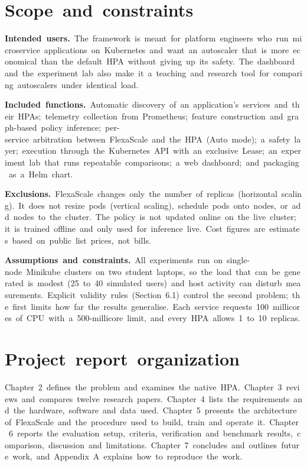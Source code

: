 \documentclass[12pt,a4paper,oneside]{report}
\begin{document}
\section{Scope~and~constraints}

\textbf{Intended~users.}~The~framework~is~meant~for~platform~engineers~who~run~microservice~applications~on~Kubernetes~and~want~an~autoscaler~that~is~more~economical~than~the~default~HPA~without~giving~up~its~safety.~The~dashboard~and~the~experiment~lab~also~make~it~a~teaching~and~research~tool~for~comparing~autoscalers~under~identical~load.


\textbf{Included~functions.}~Automatic~discovery~of~an~application's~services~and~their~HPAs;~telemetry~collection~from~Prometheus;~feature~construction~and~graph-based~policy~inference;~per-service~arbitration~between~FlexaScale~and~the~HPA~(Auto~mode);~a~safety~layer;~execution~through~the~Kubernetes~API~with~an~exclusive~Lease;~an~experiment~lab~that~runs~repeatable~comparisons;~a~web~dashboard;~and~packaging~as~a~Helm~chart.


\textbf{Exclusions.}~FlexaScale~changes~only~the~number~of~replicas~(horizontal~scaling).~It~does~not~resize~pods~(vertical~scaling),~schedule~pods~onto~nodes,~or~add~nodes~to~the~cluster.~The~policy~is~not~updated~online~on~the~live~cluster;~it~is~trained~offline~and~only~used~for~inference~live.~Cost~figures~are~estimates~based~on~public~list~prices,~not~bills.


\textbf{Assumptions~and~constraints.}~All~experiments~run~on~single-node~Minikube~clusters~on~two~student~laptops,~so~the~load~that~can~be~generated~is~modest~(25~to~40~simulated~users)~and~host~activity~can~disturb~measurements.~Explicit~validity~rules~(Section~6.1)~control~the~second~problem;~the~first~limits~how~far~the~results~generalise.~Each~service~requests~100~millicores~of~CPU~with~a~500-millicore~limit,~and~every~HPA~allows~1~to~10~replicas.


\section{Project~report~organization}

Chapter~2~defines~the~problem~and~examines~the~native~HPA.~Chapter~3~reviews~and~compares~twelve~research~papers.~Chapter~4~lists~the~requirements~and~the~hardware,~software~and~data~used.~Chapter~5~presents~the~architecture~of~FlexaScale~and~the~procedure~used~to~build,~train~and~operate~it.~Chapter~6~reports~the~evaluation~setup,~criteria,~verification~and~benchmark~results,~comparison,~discussion~and~limitations.~Chapter~7~concludes~and~outlines~future~work,~and~Appendix~A~explains~how~to~reproduce~the~work.
\end{document}
